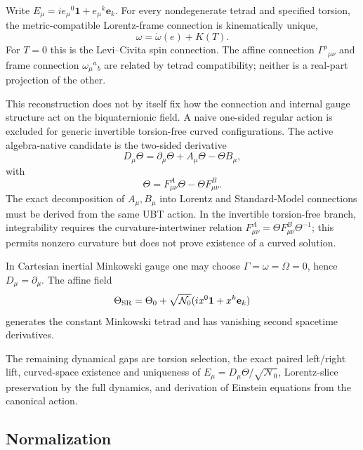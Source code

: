 Write $E_\mu=i e_\mu{}^0\mathbf1+e_\mu{}^k\mathbf e_k$.  For every
nondegenerate tetrad and specified torsion, the metric-compatible Lorentz-frame
connection is kinematically unique,
\begin{equation}
 \omega=\mathring\omega(e)+K(T).
\end{equation}
For $T=0$ this is the Levi--Civita spin connection.  The affine connection
$\Gamma^\rho{}_{\mu\nu}$ and frame connection $\omega_\mu{}^a{}_b$ are related
by tetrad compatibility; neither is a real-part projection of the other.

This reconstruction does not by itself fix how the connection and internal
gauge structure act on the biquaternionic field.  A naive one-sided regular
action is excluded for generic invertible torsion-free curved configurations.
The active algebra-native candidate is the two-sided derivative
\begin{equation}
\label{eq:canonical:nabla_structure}
 \boxed{D_\mu\Theta=\partial_\mu\Theta+A_\mu\Theta-\Theta B_\mu,}
\end{equation}
with
\begin{equation}
 [D_\mu,D_\nu]\Theta
 =F^A_{\mu\nu}\Theta-\Theta F^B_{\mu\nu}.
\end{equation}
The exact decomposition of $A_\mu,B_\mu$ into Lorentz and Standard-Model
connections must be derived from the same UBT action.  In the invertible
 torsion-free branch, integrability requires the curvature-intertwiner relation
$F^A_{\mu\nu}=\Theta F^B_{\mu\nu}\Theta^{-1}$; this permits nonzero curvature
but does not prove existence of a curved solution.

In Cartesian inertial Minkowski gauge one may choose
$\Gamma=\omega=\Omega=0$, hence $D_\mu=\partial_\mu$.  The affine field
\begin{equation}
 \Theta_{\rm SR}=\Theta_0+\sqrt{\mathcal N_0}
 (ix^0\mathbf1+x^k\mathbf e_k)
\end{equation}
generates the constant Minkowski tetrad and has vanishing second spacetime
derivatives.

The remaining dynamical gaps are torsion selection, the exact paired
left/right lift, curved-space existence and uniqueness of
$E_\mu=D_\mu\Theta/\sqrt{\mathcal N_0}$, Lorentz-slice preservation by the full
dynamics, and derivation of Einstein equations from the canonical action.

\subsection{Normalization}

